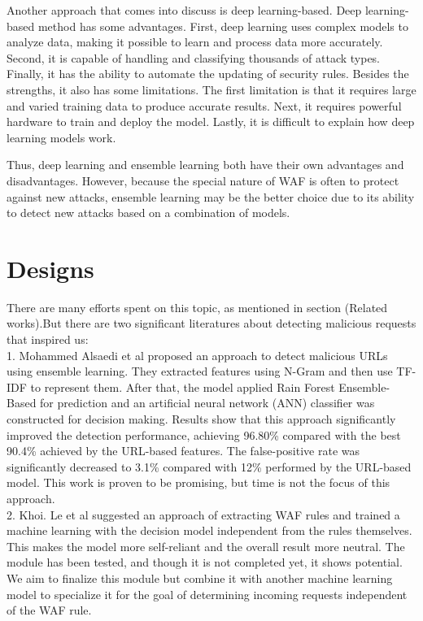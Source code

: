 Another approach that comes into discuss is deep learning-based. Deep learning-based method has some advantages. First, deep learning uses complex models to analyze data, making it possible to learn and process data more accurately. Second, it is capable of handling and classifying thousands of attack types. Finally, it has the ability to automate the updating of security rules. Besides the strengths, it also has some limitations. The first limitation is that it requires large and varied training data to produce accurate results. Next, it requires powerful hardware to train and deploy the model. Lastly, it is difficult to explain how deep learning models work. 

Thus, deep learning and ensemble learning both have their own advantages and disadvantages. However, because the special nature of WAF is often to protect against new attacks, ensemble learning may be the better choice due to its ability to detect new attacks based on a combination of models.

\section{Designs}
\label{design}
There are many efforts spent on this topic, as mentioned in section (Related works).But there are two significant literatures about detecting malicious requests that inspired us: \\
1. Mohammed Alsaedi et al\cite{s22093373} proposed an approach to detect malicious URLs using ensemble learning. They extracted features using N-Gram and then use TF-IDF to represent them. After that, the model applied Rain Forest Ensemble-Based for prediction and an artificial neural network (ANN) classifier was constructed for decision making. Results show that this approach significantly improved the detection performance, achieving 96.80\% compared with the best 90.4\% achieved by the URL-based features. The false-positive rate was significantly decreased to 3.1\% compared with 12\% performed by the URL-based model. This work is proven to be promising, but time is not the focus of this approach. \\
2. Khoi. Le et al\cite{Khoi} suggested an approach of extracting WAF rules and trained a machine learning with the decision model independent from the rules themselves. This makes the model more self-reliant and the overall result more neutral. The module has been tested, and though it is not completed yet, it shows potential. We aim to finalize this module but combine it with another machine learning model to specialize it for the goal of determining incoming requests independent of the WAF rule.

